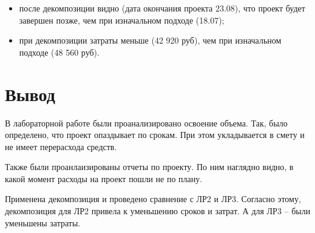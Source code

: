 \begin{itemize}
    \item после декомпозиции видно (дата окончания проекта 23.08), что проект будет завершен позже, чем при изначальном подходе (18.07);
    \item при декомпозиции затраты меньше (42 920 руб), чем при изначальном подходе (48 560 руб).
\end{itemize}



\section{Вывод}

В лабораторной работе были проанализировано освоение объема. Так, было определено, что проект опаздывает по срокам. При этом укладывается в смету и не имеет перерасхода средств.

Также были проанлаизированы отчеты по проекту. По ним наглядно видно, в какой момент расходы на проект пошли не по плану.

Применена декомпозиция и проведено сравнение с ЛР2 и ЛР3. Согласно этому, декомпозиция для ЛР2 привела к уменьшению сроков и затрат. А для ЛР3 -- были уменьшены затраты.
